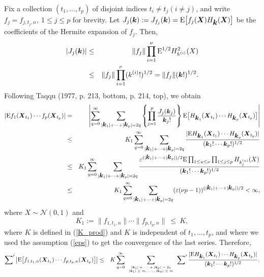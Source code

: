 \documentclass[10pt]{article}
\def\E{\mathrm E}
\newcommand{\mbf}[1]{\mbox{\boldmath $#1$}}
\begin{document}
 Fix a collection $(t_1,\dots, t_p)$ of disjoint indices $t_i \neq t_j (i\neq j)$, and write $f_j = f_{j,
t_j, n},~ 1 \le j \le p$ for brevity.  Let $J_j({\mbf k}) :=
J_{f_j}({\mbf k}) =  \E \big[f_j({\mbf X}) H_{\mbf k}({\mbf X})\big] $ be
the coefficients of the Hermite expansion of $f_j$. Then,
\begin{eqnarray*}
|J_j({\mbf k})| &\le &\|f_j\| \prod_{i=1}^\nu \E^{1/2}
H^2_{k^{(i)}}(X) \\
&\le & \|f_j\| \prod_{i=1}^\nu (k^{(i)}!)^{1/2} = \|f_j\| ({\mbf
k}!)^{1/2}.
\end{eqnarray*}
Following Taqqu (1977, p. 213, bottom, p. 214, top), %
we obtain
\begin{eqnarray*}
|\E f_1({\mbf X}_{t_1}) \cdots  f_p({\mbf X}_{t_p})|
&=&\left|\sum_{q=0}^\infty \sum_{|{\mbf k}_1|+ \dots +|{\mbf k}_p|
= 2q} \left\{\prod_{j=1}^p \frac{J_j({\mbf k}_j)}{{\mbf k}_j!}
\right\}
\E \big[H_{{\mbf k}_1}({\mbf X}_{t_1}) \cdots H_{{\mbf k}_p}({\mbf X}_{t_p})\big]\right| \\
&\le&K_1 \sum_{q=0}^\infty \sum_{|{\mbf k}_1|+ \dots +|{\mbf k}_p|
= 2q}
\frac{|\E H_{{\mbf k}_1}({\mbf X}_{t_1}) \cdots H_{{\mbf k}_p}({\mbf X}_{t_p})|}{ ({\mbf k}_1!\cdots {\mbf k}_p!)^{1/2}} \\
&\le&K_1 \sum_{q=0}^\infty \sum_{|{\mbf k}_1|+ \dots +|{\mbf k}_p|
= 2q}
\frac{\varepsilon^{(|{\mbf k}_1|+\dots + |{\mbf k}_p|)/2}
\E \prod_{1\le u \le \nu} \prod_{1\le j \le p} H_{k^{(u)}_{j}}(X)}{ ({\mbf k}_1!\cdots {\mbf k}_p!)^{1/2}}   \\
&\le&K_1 \sum_{q=0}^\infty \sum_{|{\mbf k}_1|+ \dots +|{\mbf k}_p|
= 2q} (\varepsilon (\nu p-1))^{(|{\mbf k}_1|+ \dots +|{\mbf
k}_p|)/2} < \infty,
\end{eqnarray*}
where $X \sim {\mathcal N}(0,1)$ and
$$
K_1 :=   \|f_{1,t_1,n}\| \cdots \|f_{p,t_p,n}\| \ \le \  K,
$$
where $K$ is defined in (\ref{K_prod}) and $K$ is independent of
$t_1, \dots, t_p$,  and where we used the assumption  (\ref{eps})
to get the convergence of the last series. Therefore,
\begin{eqnarray*}
\sum\nolimits^\prime \big| \E \big[f_{1,t_1,n}({\mbf X}_{t_1}) \cdots
f_{p,t_p,n}({\mbf X}_{t_p})\big] \big| &\le& K \sum_{q=0}^\infty
\sum_{\tiny
\begin{array}{c}
|{\mbf k}_1|+ \dots +|{\mbf k}_p| = 2q\\
|{\mbf k}_1| \ge m, \dots,  |{\mbf k}_\alpha| \ge m
\end{array}}
\sum\nolimits^\prime \frac{|\E H_{{\mbf k}_1}({\mbf X}_{t_1}) \cdots
H_{{\mbf k}_p}({\mbf X}_{t_p})| } {({\mbf k}_1!\cdots {\mbf
k}_p!)^{1/2}}.
\end{eqnarray*}
\end{document}
